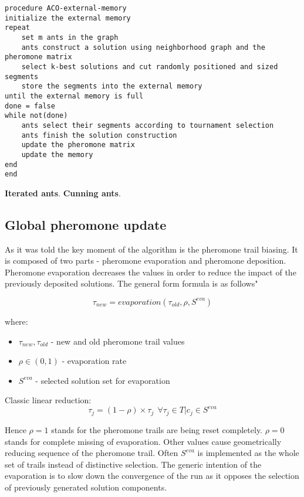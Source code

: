 \begin{minipage}[c, breaklines=true]{0.95\textwidth}
\begin{lstlisting}[caption=External memory iteration pseudo-code]
procedure ACO-external-memory
initialize the external memory
repeat
	set m ants in the graph
	ants construct a solution using neighborhood graph and the pheromone matrix
	select k-best solutions and cut randomly positioned and sized segments
	store the segments into the external memory
until the external memory is full
done = false
while not(done)
	ants select their segments according to tournament selection
	ants finish the solution construction
	update the pheromone matrix
	update the memory
end
end
\end{lstlisting}
\end{minipage}



\textbf{Iterated ants}.
\textbf{Cunning ants}.

\subsection{Global pheromone update}
As it was told the key moment of the algorithm is the pheromone trail biasing. It is composed of two parts - pheromone evaporation and pheromone deposition. Pheromone evaporation decreases the values in order to reduce the impact of the previously deposited solutions. The general form formula is as follows"

\begin{equation}
\tau_{new}=evaporation(\tau_{old}, \rho, S^{eva})
\end{equation}

where:
\begin{itemize}
\item $\tau_{new}, \tau_{old}$ - new and old pheromone trail values
\item $\rho \in (0,1)$ - evaporation rate
\item $S^{eva}$ - selected solution set for evaporation
\end{itemize}

Classic linear reduction:
\begin{equation}
\tau_j = (1-\rho) \times \tau_j \ \ \forall  \tau_j \in T | c_j \in S^{eva}
\end{equation}

Hence $\rho=1$ stands for the pheromone trails are being reset completely. $\rho=0$ stands for complete missing of evaporation. Other values cause geometrically reducing sequence of the pheromone trail. Often $S^{eva}$ is implemented as the whole set of trails instead of distinctive selection. The generic intention of the evaporation is to slow down the convergence of the run as it opposes the selection of previously generated solution components. \\

